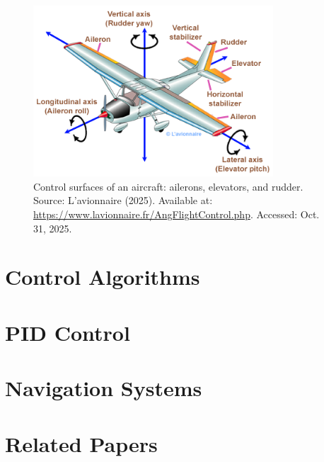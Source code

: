 \begin{figure}[H]
    \centering
    \includegraphics[width=0.8\textwidth]{figures/flight_controls.png}
    \caption{Control surfaces of an aircraft: ailerons, elevators, and rudder. \\ Source: L'avionnaire (2025). Available at: \url{https://www.lavionnaire.fr/AngFlightControl.php}. Accessed: Oct. 31, 2025.}
    \label{fig:control_surfaces}
\end{figure}

\section{Control Algorithms}

\section{PID Control}

\section{Navigation Systems}

\section{Related Papers}